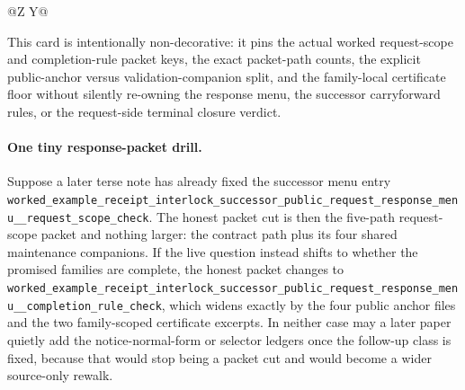 \documentclass[11pt]{article}
\begin{document}
\begin{table}[t]
\begin{tabularx}{\linewidth}{@{}Z Y@{}}
\bottomrule
\end{tabularx}
\caption{A minimal public response-packet card. This is the smallest public answer later terse papers can quote directly when the live issue is the exact bounded handoff slice that should travel for one notice/follow-up pair rather than merely which maintained owner was selected or whether a successor refresh branch later reopens.}
\label{tab:minimal-public-response-packet-card}
\end{table}

This card is intentionally non-decorative: it pins the actual worked request-scope and completion-rule packet keys, the exact packet-path counts, the explicit public-anchor versus validation-companion split, and the family-local certificate floor without silently re-owning the response menu, the successor carryforward rules, or the request-side terminal closure verdict.\cite{series:workedexample}

\paragraph{One tiny response-packet drill.}
Suppose a later terse note has already fixed the successor menu entry \nolinkurl{worked_example_receipt_interlock_successor_public_request_response_menu__request_scope_check}. The honest packet cut is then the five-path request-scope packet and nothing larger: the contract path plus its four shared maintenance companions. If the live question instead shifts to whether the promised families are complete, the honest packet changes to \nolinkurl{worked_example_receipt_interlock_successor_public_request_response_menu__completion_rule_check}, which widens exactly by the four public anchor files and the two family-scoped certificate excerpts. In neither case may a later paper quietly add the notice-normal-form or selector ledgers once the follow-up class is fixed, because that would stop being a packet cut and would become a wider source-only rewalk.\cite{series:workedexample}
\end{document}
